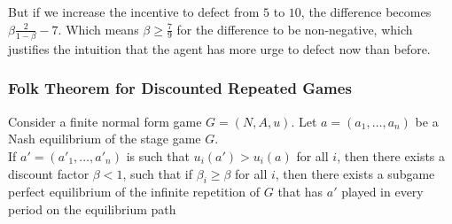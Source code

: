 But if we increase the incentive to defect from $5$ to $10$, the difference becomes $\beta \frac{2}{1-\beta} -  7$. Which means $\beta \geq \frac{7}{9}$ for the difference to be non-negative, which justifies the intuition that the agent has more urge to defect now than before. 
\subsubsection{Folk Theorem for Discounted Repeated Games}
Consider a finite normal form game $G = (N, A, u)$. Let $a = (a_1, \dots , a_n) $ be a Nash equilibrium of the stage game $G$.\\

If $a'= (a'_1, \dots, a'_n)$ is such that $u_i(a') > u_i(a)$ for all $i$, then there exists a discount factor $\beta < 1$, such that if $\beta_i \geq \beta$ for all $i$, then there exists a subgame perfect equilibrium of the infinite repetition of $G$ that has $a'$ played in every period on the equilibrium path
